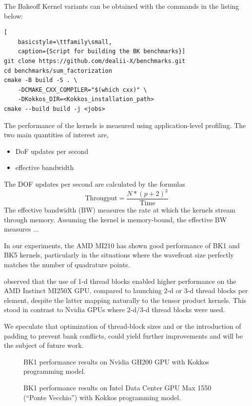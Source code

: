 \documentclass[a4paper,12pt]{article}
\begin{document}
The Bakeoff Kernel variants can be obtained with the commands in the listing below:

\begin{lstlisting}[
    basicstyle=\ttfamily\small,
    caption={Script for building the BK benchmarks}]
git clone https://github.com/dealii-X/benchmarks.git
cd benchmarks/sum_factorization
cmake -B build -S . \
    -DCMAKE_CXX_COMPILER="$(which cxx)" \
    -DKokkos_DIR=<Kokkos_installation_path>
cmake --build build -j <jobs>
\end{lstlisting}

The performance of the kernels is measured using application-level profiling.
The two main quantities of interest are,
\begin{itemize}
    \item DoF updates per second
    \item effective bandwidth
\end{itemize}

The DOF updates per second are calculated by the formulas
\begin{equation}
   \text{Througput} = \frac{N * (p+2)^3}{\text{Time}}
\end{equation}
The effective bandwidth (BW) measures the rate at which the kernels stream through
memory. Assuming the kernel is memory-bound, the effective BW measures ...


In our experiments, the AMD MI210 has shown good performance of BK1 and BK5 kernels, particularly in the situations where the wavefront size perfectly matches the
number of quadrature points.

\cite{Karp2023} observed that the use of 1-d thread blocks enabled higher
performance on the AMD Instinct MI250X GPU, compared to launching 2-d or 3-d
thread blocks per element, despite the latter mapping naturally to the tensor product kernels.
This stood in contrast to Nvidia GPUs where 2-d/3-d thread blocks were used.

We speculate that optimization of thread-block sizes and or the introduction of padding to prevent bank conflicts, could yield further improvements and will be the subject of future work.

\begin{figure}
\centering
\caption{BK1 performance results on Nvidia GH200 GPU with Kokkos programming model.}
\label{fig:BK1_GH200}
\end{figure}

\begin{figure}
\centering
\caption{BK1 performance results on Intel Data Center GPU Max 1550 (``Ponte Vecchio'') with Kokkos programming model.}
\label{fig:BK1_PVC}
\end{figure}
\end{document}

